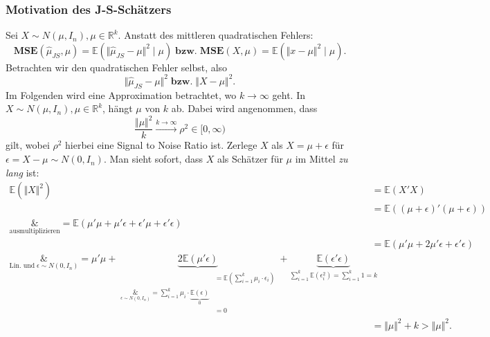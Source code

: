 \documentclass[10pt]{article}
\newcommand{\IR}{\mathbb{R}} %
\newcommand{\EW}{\mathbb{E}} %
\newcommand{\MSE}{\textbf{MSE}} %
\newcommand{\JSEM}{\hat{\mu}_{JS}} %
\begin{document}
	\subsubsection{Motivation des J-S-Schätzers}
	Sei $X \sim N(\mu, I_n), \mu \in \IR^k$. Anstatt des mittleren quadratischen Fehlers:
	\begin{equation*}
		\MSE(\hat{\mu}_{JS}, \mu) = \EW(\Vert \JSEM - \mu \Vert^2 \mid \mu) \; \textbf{bzw.} \; \MSE(X, \mu) = \EW( \Vert x - \mu \Vert^2 \mid \mu).
	\end{equation*}
	Betrachten wir den quadratischen Fehler selbst, also
	\begin{equation*}
		\Vert \JSEM - \mu \Vert^2 \; \textbf{bzw.} \; \Vert X - \mu \Vert^2.
	\end{equation*}
	Im Folgenden wird eine Approximation betrachtet, wo $k \rightarrow \infty$ geht. In $X \sim N(\mu, I_n), \mu \in \IR^k$, hängt $\mu$ von $k$ ab. Dabei wird angenommen, dass
	\begin{equation*}
		\frac{\Vert \mu \Vert^2}{k} \overset{k \rightarrow \infty}{\longrightarrow} \rho^2 \in [0, \infty) 
	\end{equation*}
	gilt, wobei $\rho^2$ hierbei eine Signal to Noise Ratio ist.
	Zerlege $X$ als $X = \mu + \epsilon$ für $\epsilon = X- \mu \sim N(0, I_n)$.
	Man sieht sofort, dass $X$ als Schätzer für $\mu$ im Mittel \textit{zu lang} ist:
	\begin{equation*}
		\begin{split}
			\EW(\Vert X \Vert^2) &= \EW(X'X) \\
			&= \EW((\mu + \epsilon)'(\mu + \epsilon)) \\
			\underset{\text{ausmultiplizieren}}&{=} \EW(\mu' \mu + \mu' \epsilon + \epsilon' \mu + \epsilon' \epsilon) \\
			&= \EW(\mu'\mu + 2\mu'\epsilon + \epsilon'\epsilon)\\
			\underset{\text{Lin. und}\; \epsilon \sim N(0,I_n)}&{=} \mu' \mu + \underbrace{2\EW(\mu'\epsilon)}_{\begin{split}
					&= \EW(\sum_{i=1}^{k} \mu_i \cdot \epsilon_i)\\
					\underset{\epsilon \sim N(0,I_n)}&{=} \sum_{i = 1}^{k} \mu_i \cdot \underbrace{\EW(\epsilon)}_{0}\\
					&=0
				\end{split}} + \underbrace{\EW(\epsilon' \epsilon)}_{\sum_{i=1}^{k}\EW(\epsilon_i^2)= \sum_{i = 1}^{k} 1 = k}\\
			&= \Vert \mu \Vert^2 +k > \Vert \mu \Vert^2.
		\end{split}
	\end{equation*}
	
\end{document}
